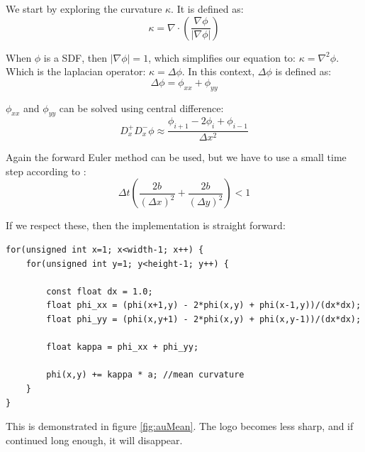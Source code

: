 We start by exploring the curvature $\kappa$. It is defined as:
\begin{equation}
  \kappa = \nabla\cdot\left(\frac{\nabla\phi}{|\nabla\phi|}\right)
\end{equation}

When $\phi$ is a SDF, then $|\nabla\phi|=1$, which simplifies our equation
to: $\kappa = \nabla^2\phi$. Which is the laplacian operator: $\kappa =
\Delta\phi$. In this context, $\Delta\phi$ is defined as:
\begin{equation}
  \Delta\phi = \phi_{xx} + \phi_{yy}
\end{equation}

$\phi_{xx}$ and $\phi_{yy}$ can be solved using central difference:
\begin{equation}
  D^+_xD^-_x\phi 
  \approx
  \frac{\phi_{i+1}-2\phi_i+\phi_{i-1}}{\Delta x^2}
\end{equation} %

Again the forward Euler method can be used, but we have to use a small
time step according to :
\begin{equation}
   \Delta t \left(
     \frac{2b}{(\Delta x)^2} +
     \frac{2b}{(\Delta y)^2}
   \right) < 1
\end{equation}

If we respect these, then the  implementation is straight forward:


\begin{lstlisting}
for(unsigned int x=1; x<width-1; x++) {
    for(unsigned int y=1; y<height-1; y++) {

        const float dx = 1.0;
        float phi_xx = (phi(x+1,y) - 2*phi(x,y) + phi(x-1,y))/(dx*dx);
        float phi_yy = (phi(x,y+1) - 2*phi(x,y) + phi(x,y-1))/(dx*dx);

        float kappa = phi_xx + phi_yy;
 
        phi(x,y) += kappa * a; //mean curvature
    }
}
\end{lstlisting}

This is demonstrated in figure \ref{fig:auMean}. The logo becomes less
sharp, and if continued long enough, it will disappear. 

